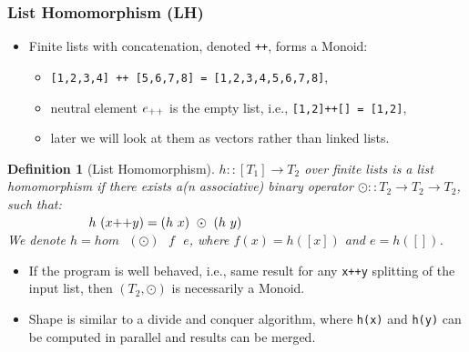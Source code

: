 \documentclass{beamer}
\renewcommand{\emph}[1]{\textcolor{structure}{#1}}
\newcommand{\emp}[1]{\textcolor{DikuRed}{ #1}}
\newtheorem{mydef}{Definition}
\begin{document}
\begin{frame}
  \frametitle{List Homomorphism (LH)}

\begin{itemize}
    \item Finite lists with concatenation, denoted {\tt ++}, forms a Monoid:
        \begin{itemize}
            \item {\tt [1,2,3,4] ++ [5,6,7,8] = [1,2,3,4,5,6,7,8]},
            \item neutral element $e_{\tt++}$ is the empty list, 
                i.e., {\tt [1,2]++[] = [1,2]},
            \item later we will look at them as \emph{vectors} rather 
                    than \alert{linked lists}.
        \end{itemize}
\end{itemize}

\begin{mydef}[List Homomorphism]\label{LHomDef}
$h :: [T_1] \rightarrow T_2$ over finite lists is a {\em list homomorphism}
if there exists a(n associative) binary operator $\odot :: T_2 \rightarrow T_2 \rightarrow T_2$,
such that: \\
$\mbox{ }\mbox{ }\mbox{ }\mbox{ }\mbox{ }\mbox{ }\mbox{ }\mbox{ }\mbox{ }$
\emp{$h \mbox{ } (x{\tt ++}y) = (h\mbox{ }x)\mbox{ }\odot\mbox{ }(h\mbox{ }y)$} \\
We denote $h = hom \mbox{ }(\odot) \mbox{ }f\mbox{ }e$, where $f(x) = h([x])$ 
and $e = h([])$. 
\end{mydef}

\begin{itemize}
    \item If the program is well behaved, i.e., same result
            for any {\tt x++y} splitting of the input list, 
            then $(T_2,\odot)$ is necessarily a Monoid.\smallskip

    \item Shape is similar to a divide and conquer algorithm, where 
            {\tt h(x)} and {\tt h(y)} can be computed in parallel 
            and results can be merged. 
\end{itemize}
\end{frame}
\end{document}
